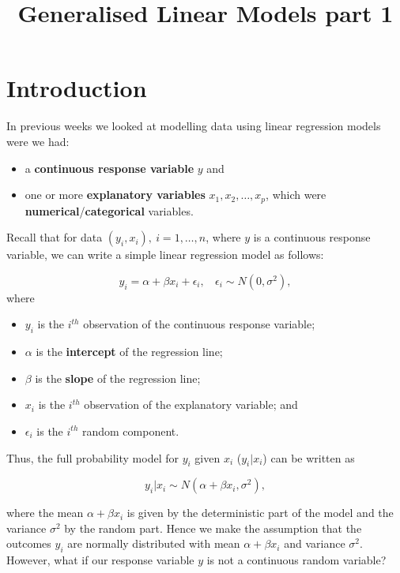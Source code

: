 \documentclass[
  letterpaper,
  DIV=11,
  numbers=noendperiod]{scrartcl}
\title{Generalised Linear Models part 1}
\author{}
\date{}
\makeatletter
\providecommand{\tightlist}{%
  \setlength{\itemsep}{0pt}\setlength{\parskip}{0pt}}\usepackage{longtable,booktabs,array}
\renewcommand{\maketitle}{\bgroup\setlength{\parindent}{0pt}
\begin{flushleft}
  {\color{uniblue}\sffamily\huge\textbf{\@title}} \vspace{0.3cm} \newline
  {\Large {\@subtitle}} \newline
  \@author
\end{flushleft}\egroup
}
\makeatother
\begin{document}
\maketitle

\pagestyle{mystyle}

\section{Introduction}\label{introduction}

In previous weeks we looked at modelling data using linear regression
models were we had:

\begin{itemize}
\tightlist
\item
  a \textbf{continuous response variable} \(y\) and
\item
  one or more \textbf{explanatory variables} \(x_1, x_2,\ldots, x_p\),
  which were \textbf{numerical}/\textbf{categorical} variables.
\end{itemize}

Recall that for data \((y_i, x_i), ~ i = 1,\ldots, n\), where \(y\) is a
continuous response variable, we can write a simple linear regression
model as follows:

\[y_i = \alpha + \beta x_i + \epsilon_i, ~~~~ \epsilon_i \sim N(0, \sigma^2),\]
where

\begin{itemize}
\tightlist
\item
  \(y_i\) is the \(i^{th}\) observation of the continuous response
  variable;
\item
  \(\alpha\) is the \textbf{intercept} of the regression line;
\item
  \(\beta\) is the \textbf{slope} of the regression line;
\item
  \(x_i\) is the \(i^{th}\) observation of the explanatory variable; and
\item
  \(\epsilon_i\) is the \(i^{th}\) random component.
\end{itemize}

Thus, the full probability model for \(y_i\) given \(x_i\)
(\(y_i | x_i\)) can be written as

\[y_i | x_i \sim N(\alpha + \beta x_i, \sigma^2),\]

where the mean \(\alpha + \beta x_i\) is given by the deterministic part
of the model and the variance \(\sigma^2\) by the random part. Hence we
make the assumption that the outcomes \(y_i\) are normally distributed
with mean \(\alpha + \beta x_i\) and variance \(\sigma^2\). However,
what if our response variable \(y\) is not a continuous random variable?
\end{document}

